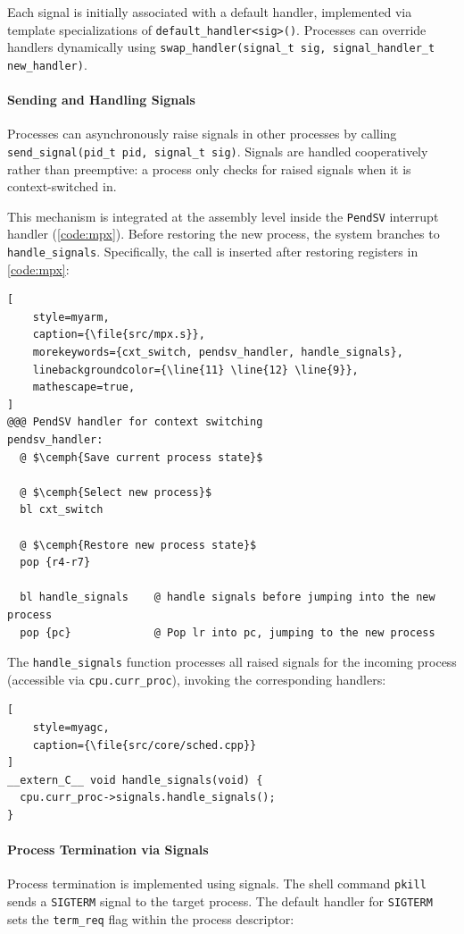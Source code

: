 Each signal is initially associated with a default handler, implemented via template
specializations of \lstinline[style=myagc]|default_handler<sig>()|.  Processes can
override handlers dynamically using %
\lstinline[style=myagc]|swap_handler(signal_t sig, signal_handler_t new_handler)|.

\paragraph*{Sending and Handling Signals} Processes can asynchronously raise signals in
other processes by calling %
\lstinline[style=myagc]|send_signal(pid_t pid, signal_t sig)|.  Signals are handled
cooperatively rather than preemptive: a process only checks for raised signals when it
is context-switched in.

This mechanism is integrated at the assembly level inside the \texttt{PendSV} interrupt
handler (\autoref{code:mpx}). Before restoring the new process, the system branches to
\lstinline[style=myagc]|handle_signals|. Specifically, the call is inserted after
restoring registers in \autoref{code:mpx}:

\begin{lstlisting}[
    style=myarm,
    caption={\file{src/mpx.s}},
    morekeywords={cxt_switch, pendsv_handler, handle_signals},
    linebackgroundcolor={\line{11} \line{12} \line{9}},
    mathescape=true,
]
@@@ PendSV handler for context switching
pendsv_handler:
  @ $\cemph{Save current process state}$

  @ $\cemph{Select new process}$
  bl cxt_switch        

  @ $\cemph{Restore new process state}$
  pop {r4-r7}

  bl handle_signals    @ handle signals before jumping into the new process
  pop {pc}             @ Pop lr into pc, jumping to the new process
\end{lstlisting}

The \lstinline[style=myagc]|handle_signals| function processes all raised signals for
the incoming process (accessible via \lstinline[style=myagc]|cpu.curr_proc|), invoking
the corresponding handlers:

\begin{lstlisting}[
    style=myagc,
    caption={\file{src/core/sched.cpp}}
]
__extern_C__ void handle_signals(void) {
  cpu.curr_proc->signals.handle_signals();
}
\end{lstlisting}

\paragraph*{Process Termination via Signals} Process termination is implemented using
signals.  The shell command \lstinline[style=mytty]|pkill| sends a
\lstinline[style=myagc]|SIGTERM| signal to the target process.  The default handler for
\lstinline[style=myagc]|SIGTERM| sets the \lstinline[style=myagc]|term_req| flag within
the process descriptor:

